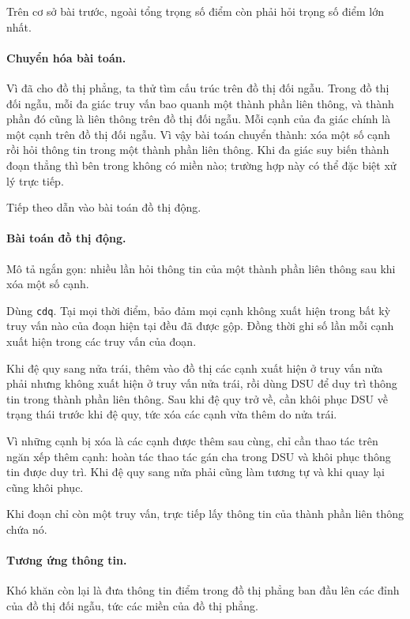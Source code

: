\documentclass[11pt]{article}
\begin{document}
Trên cơ sở bài trước, ngoài tổng trọng số điểm còn phải hỏi trọng số điểm lớn
nhất.

\paragraph{Chuyển hóa bài toán.}
Vì đã cho đồ thị phẳng, ta thử tìm cấu trúc trên đồ thị đối ngẫu. Trong đồ thị
đối ngẫu, mỗi đa giác truy vấn bao quanh một thành phần liên thông, và thành
phần đó cũng là liên thông trên đồ thị đối ngẫu. Mỗi cạnh của đa giác chính là
một cạnh trên đồ thị đối ngẫu. Vì vậy bài toán chuyển thành: xóa một số cạnh
rồi hỏi thông tin trong một thành phần liên thông. Khi đa giác suy biến thành
đoạn thẳng thì bên trong không có miền nào; trường hợp này có thể đặc biệt xử
lý trực tiếp.

Tiếp theo dẫn vào bài toán đồ thị động.

\paragraph{Bài toán đồ thị động.}
Mô tả ngắn gọn: nhiều lần hỏi thông tin của một thành phần liên thông sau khi
xóa một số cạnh.

Dùng \texttt{cdq}. Tại mọi thời điểm, bảo đảm mọi cạnh không xuất hiện trong bất
kỳ truy vấn nào của đoạn hiện tại đều đã được gộp. Đồng thời ghi số lần mỗi cạnh
xuất hiện trong các truy vấn của đoạn.

Khi đệ quy sang nửa trái, thêm vào đồ thị các cạnh xuất hiện ở truy vấn nửa
phải nhưng không xuất hiện ở truy vấn nửa trái, rồi dùng DSU để duy trì thông
tin trong thành phần liên thông. Sau khi đệ quy trở về, cần khôi phục DSU về
trạng thái trước khi đệ quy, tức xóa các cạnh vừa thêm do nửa trái.

Vì những cạnh bị xóa là các cạnh được thêm sau cùng, chỉ cần thao tác trên ngăn
xếp thêm cạnh: hoàn tác thao tác gán cha trong DSU và khôi phục thông tin được
duy trì. Khi đệ quy sang nửa phải cũng làm tương tự và khi quay lại cũng khôi
phục.

Khi đoạn chỉ còn một truy vấn, trực tiếp lấy thông tin của thành phần liên thông
chứa nó.

\paragraph{Tương ứng thông tin.}
Khó khăn còn lại là đưa thông tin điểm trong đồ thị phẳng ban đầu lên các đỉnh
của đồ thị đối ngẫu, tức các miền của đồ thị phẳng.
\end{document}
